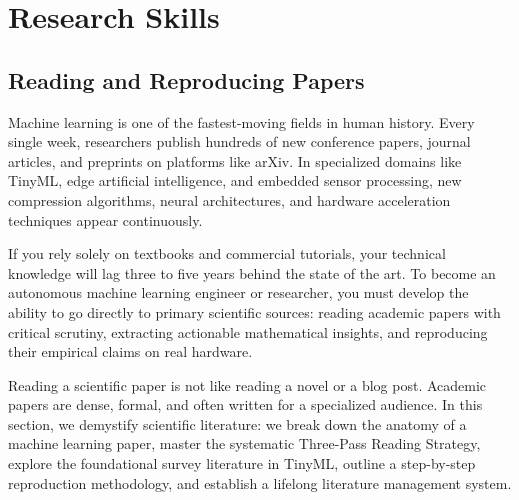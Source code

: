 \chapter{Research Skills}\label{ch:research_skills}
\section{Reading and Reproducing Papers}\label{sec:reading_reproducing}

Machine learning is one of the fastest-moving fields in human history. Every single week, researchers publish hundreds of new conference papers, journal articles, and preprints on platforms like arXiv. In specialized domains like TinyML, edge artificial intelligence, and embedded sensor processing, new compression algorithms, neural architectures, and hardware acceleration techniques appear continuously.

If you rely solely on textbooks and commercial tutorials, your technical knowledge will lag three to five years behind the state of the art. To become an autonomous machine learning engineer or researcher, you must develop the ability to go directly to primary scientific sources: reading academic papers with critical scrutiny, extracting actionable mathematical insights, and reproducing their empirical claims on real hardware.

Reading a scientific paper is not like reading a novel or a blog post. Academic papers are dense, formal, and often written for a specialized audience. In this section, we demystify scientific literature: we break down the anatomy of a machine learning paper, master the systematic Three-Pass Reading Strategy, explore the foundational survey literature in TinyML, outline a step-by-step reproduction methodology, and establish a lifelong literature management system.

